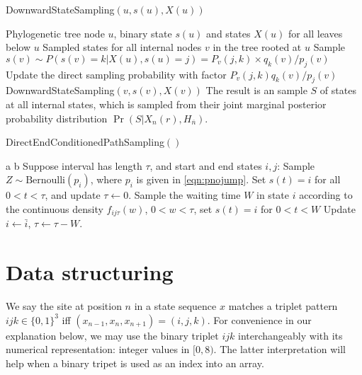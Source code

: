 \documentclass[11pt]{article}
\begin{document}
\begin{algorithm}[h!]
  \begin{algorithmic}[1]
    \caption{DownwardStateSampling$(u, s(u), X(u))$}\label{alg:topdown}
    \REQUIRE Phylogenetic tree node $u$, binary state $s(u)$ and
    states $X(u)$ for all leaves below $u$
    \ENSURE Sampled states for all internal nodes $v$ in the tree
    rooted at $u$
    \STATE Sample $s(v) \sim P(s(v)=k|X(u), s(u)=j) = P_v(j, k) \times q_k(v)\slash p_j(v)$
    \STATE Update the direct sampling probability with factor $P_v(j,k)q_k(v)\slash p_j(v)$
    \STATE DownwardStateSampling$(v, s(v), X(v))$
    \ENDFOR
    \STATE The result is an sample $S$ of states at all internal states,
    which is sampled from their joint marginal posterior probability
    distribution $\Pr(S| X_n(r), H_{\overline{n}}) $.
  \end{algorithmic}
\end{algorithm}

\begin{algorithm}[h!]
  \begin{algorithmic}[1]
    \caption{DirectEndConditionedPathSampling$()$}\label{alg:samplepath}
    \REQUIRE a
    \ENSURE b
    \STATE Suppose interval has length $\tau$, and start and end states $i, j$:
    \STATE Sample $Z\sim \text{Bernoulli}(p_i)$, where
    $p_i$ is given in \eqref{eqn:pnojump}.
    \STATE Set $s(t) = i$ for all $0 < t < \tau$, and update $\tau \gets 0$.
    \ENDIF
    \ENDIF
    \STATE Sample the waiting time $W$ in state $i$ according to the continuous
    density $f_{ij\tau}(w)$, $0< w < \tau$, set $s(t) = i$ for $0 < t < W$
    \STATE Update $i \gets \bar{i}$, $\tau \gets \tau - W$.
    \ENDIF
    \ENDWHILE
  \end{algorithmic}
\end{algorithm}

\appendix

\section{Data structuring}
\label{sec:datastruct}

We say the site at position $n$ in a state sequence $x$ matches a
triplet pattern $ijk\in\{0,1\}^3$ iff $(x_{n-1},x_n,x_{n+1})=(i,j,k)$.
For convenience in our explanation below, we may use the binary
triplet $ijk$ interchangeably with its numerical representation:
integer values in $[0,8)$. The latter interpretation will help when a
binary tripet is used as an index into an array.
\end{document}
